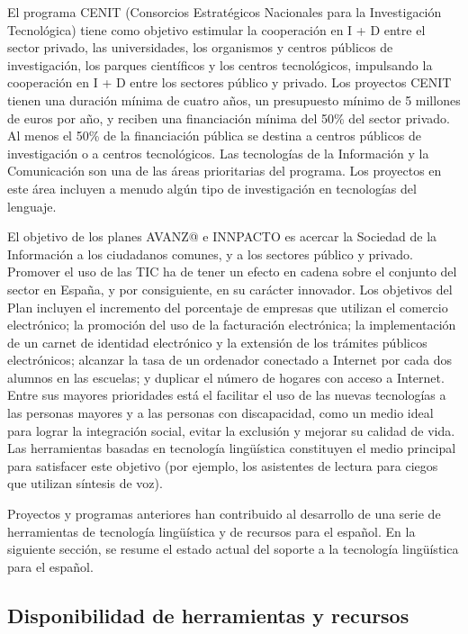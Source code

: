 \begin{multicols}{2}
El programa CENIT (Consorcios Estratégicos Nacionales para la Investigación Tecnológica) tiene como objetivo estimular la cooperación en I + D entre el sector privado, las universidades, los organismos y centros públicos de investigación, los parques científicos y los centros tecnológicos, impulsando la cooperación en I + D entre los sectores público y privado. Los proyectos CENIT tienen una duración mínima de cuatro años, un presupuesto mínimo de 5 millones de euros por año, y reciben una financiación mínima del 50\% del sector privado. Al menos el 50\% de la financiación pública se destina a centros públicos de investigación o a centros tecnológicos. Las tecnologías de la Información y la Comunicación son una de las áreas prioritarias del programa. Los proyectos en este área incluyen a menudo algún tipo de investigación en tecnologías del lenguaje.

El objetivo de los planes AVANZ@ e INNPACTO es acercar la Sociedad de la Información a los ciudadanos comunes, y a los sectores público y privado. Promover el uso de las TIC ha de tener un efecto en cadena sobre el conjunto del sector en España, y por consiguiente, en su carácter innovador. Los objetivos del Plan incluyen el incremento del porcentaje de empresas que utilizan el comercio electrónico; la promoción del uso de la facturación electrónica; la  implementación de un carnet de identidad electrónico y la extensión de los trámites públicos electrónicos; alcanzar la tasa de un ordenador conectado a Internet por cada dos alumnos en las escuelas; y duplicar el número de hogares con acceso a Internet. Entre sus mayores prioridades está el facilitar el uso de las nuevas tecnologías a las personas mayores y a las personas con discapacidad, como un medio ideal para lograr la integración social, evitar la exclusión y mejorar su calidad de vida. Las herramientas basadas en tecnología lingüística constituyen el medio principal para satisfacer este objetivo  (por ejemplo, los asistentes de lectura para ciegos que utilizan síntesis de voz).

Proyectos y programas anteriores han contribuido al desarrollo de una serie de herramientas de tecnología lingüística y de recursos para el español. En la siguiente sección, se resume el estado actual del soporte a la tecnología lingüística para el español.  

\subsection{Disponibilidad de herramientas y recursos}


\end{multicols}

